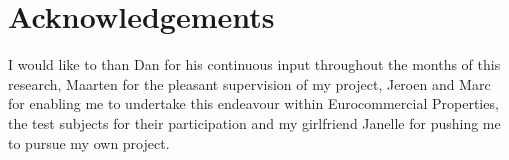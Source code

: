 \section{Acknowledgements}
\label{section:acknowledgements}
I would like to than Dan for his continuous input throughout the months of this research, Maarten for the pleasant supervision of my project, Jeroen and Marc for enabling me to undertake this endeavour within Eurocommercial Properties, the test subjects for their participation and my girlfriend Janelle for pushing me to pursue my own project.